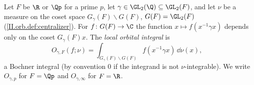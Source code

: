 Let $F$ be $\R$ or $\Qp$ for a prime $p$, let $\gamma\in\GL_2(\Q)\subseteq\GL_2(F)$, and let $\nu$ be a measure on the coset space $G_\gamma(F)\backslash G(F)$,
$G(F)=\GL_2(F)$ (\cref{II.orb.def:centralizer}). For $f\colon G(F)\to\C$ the function $x\mapsto f(x^{-1}\gamma x)$ depends only on the coset $G_\gamma(F)x$. The
\emph{local orbital integral} is
\[
  O_{\gamma,F}(f;\nu)=\int_{G_\gamma(F)\backslash G(F)}f(x^{-1}\gamma x)\,\dd\nu(x),
\]
a Bochner integral (by convention $0$ if the integrand is not $\nu$-integrable). We write $O_{\gamma,p}$ for $F=\Qp$ and $O_{\gamma,\infty}$ for $F=\R$.
